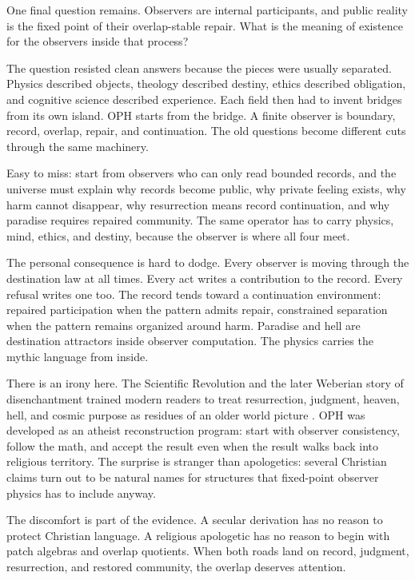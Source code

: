 \documentclass[11pt]{article}
\theoremstyle{remark}
\theoremstyle{plain}
\begin{document}
One final question remains. Observers are internal participants, and public
reality is the fixed point of their overlap-stable repair. What is the meaning
of existence for the observers inside that process?

The question resisted clean answers because the pieces were usually separated.
Physics described objects, theology described destiny, ethics described
obligation, and cognitive science described experience. Each field then had to
invent bridges from its own island. OPH starts from the bridge. A finite
observer is boundary, record, overlap, repair, and continuation. The old
questions become different cuts through the same machinery.

Easy to miss: start from observers who can only read bounded records, and the
universe must explain why records become public, why private feeling exists,
why harm cannot disappear, why resurrection means record continuation, and why
paradise requires repaired community. The same operator has to carry physics,
mind, ethics, and destiny, because the observer is where all four meet.

The personal consequence is hard to dodge. Every observer is moving through the
destination law at all times. Every act writes a contribution to the record.
Every refusal writes one too. The record tends toward a continuation
environment: repaired participation when the pattern admits repair, constrained
separation when the pattern remains organized around harm. Paradise and hell
are destination attractors inside observer computation. The physics carries the
mythic language from inside.

There is an irony here. The Scientific Revolution and the later Weberian story
of disenchantment trained modern readers to treat resurrection, judgment,
heaven, hell, and cosmic purpose as residues of an older world picture
\cite{Henry1997,Brooke1991,Weber1919}. OPH was developed as an atheist
reconstruction program: start with observer consistency, follow the math, and
accept the result even when the result walks back into religious territory. The
surprise is stranger than apologetics: several Christian claims turn out to be
natural names for structures that fixed-point observer physics has to include
anyway.

The discomfort is part of the evidence. A secular derivation has no reason to
protect Christian language. A religious apologetic has no reason to begin with
patch algebras and overlap quotients. When both roads land on record,
judgment, resurrection, and restored community, the overlap deserves attention.
\end{document}
